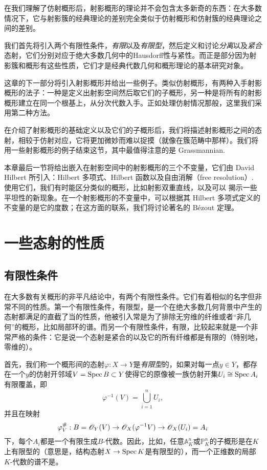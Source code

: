 在我们理解了仿射概形后，射影概形的理论并不会包含太多新奇的东西：在大多数情况下，它与射影簇的经典理论的差别完全类似于仿射概形和仿射簇的经典理论之间的差别。

我们首先将引入两个有限性条件，\textit{有限}以及\textit{有限型}，然后定义和讨论\textit{分离}以及\textit{紧合}态射，它们分别对应于绝大多数几何中的Hausdorff性与紧性。而正是部分因为射影簇和概形有这些性质，它们才是经典代数几何和概形理论的基本研究对象。

这章的下一部分将引入射影概形并给出一些例子。类似仿射概形，有两种入手射影概形的法子：一种是定义出射影空间然后取它们的子概形，另一种是将所有的射影概形建立在同一个根基上，从分次代数入手。正如处理仿射情况那般，这里我们采用第二种方法。

在介绍了射影概形的基础定义以及它们的子概形后，我们将描述射影概形之间的态射，相较于仿射对应，它将更加微妙而难以捉摸（就像在簇范畴中那样）。我们将用一些射影概形的例子结束这节，其中最值得注意的是 Grassmannian.

本章最后一节将给出嵌入在射影空间中的射影概形的三个不变量，它们由 David Hilbert 所引入：Hilbert 多项式、Hilbert 函数以及自由消解（free resolution）. 使用它们，我们有时能区分类似的概形，比如射影双重直线，以及可以
揭示一些平坦性的新现象。在一个射影概形的不变量中，可以根据其 Hilbert 多项式定义的不变量的是它的度数；在这方面的联系，我们将讨论著名的 B\'{e}zout 定理。

\section{一些态射的性质}\label{s:3.1}

\subsection{有限性条件}\label{s:3.1.1}

在大多数有关概形的非平凡结论中，有两个有限性条件。它们有着相似的名字但非常不同的性质。第一个有限性条件，有限型，是一个在绝大多数几何背景中产生的态射都满足的直截了当的性质，他被引入常是为了排除无穷维的纤维或者“非几何”的概形，比如局部环的谱。而另一个有限性条件，有限，比较起来就是一个非常严格的条件：它是说一个态射是紧合的以及它的所有纤维都是有限的（特别地，零维的）。

首先，我们称一个概形间的态射$\varphi:X\to Y$是\textit{有限型}的，如果对每一点$y\in Y$，都存在一个$y$的仿射开邻域$V=\operatorname{Spec} B\subset Y$使得它的原像被一族仿射开集$U_i\cong \operatorname{Spec} A_i$有限覆盖，即
\[
	\varphi^{-1}(V)=\bigcup_{i=1}^n U_i,
\]
并且在映射
\[
	\varphi_V^\#:B=\mathscr{O}_Y(V)\to \mathscr{O}_X (\varphi^{-1}V)\to \mathscr{O}_X(U_i)=A_i
\]
下，每个$A_i$都是一个有限生成$B$\hyp 代数。因此，比如，任意$\mathbb{A}_K^n$或$\mathbb{P}_K^n$的子概形是在$K$上有限型的（意思是，结构态射$X\to \operatorname{Spec} K$是有限型的），而一个正维数的局部$K$\hyp 代数的谱不是。

